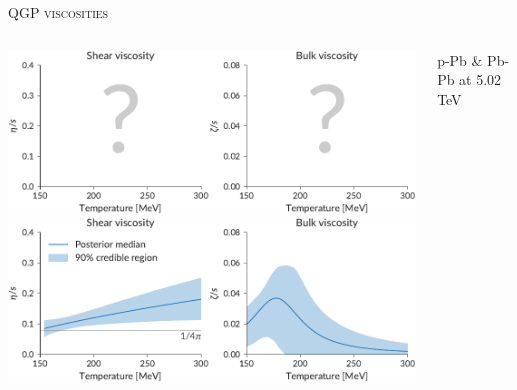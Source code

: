 \documentclass[aspectratio=169]{beamer}
\begin{document}
\begin{frame}{\scshape QGP viscosities}
  \bigskip
  \begin{columns}
    \begin{column}{.6\textwidth}
      \includegraphics[width=\textwidth]{fig/region_shear_bulk_blank}\\[2ex]
      \includegraphics[width=\textwidth]{fig/region_shear_bulk}
    \end{column}
    \begin{column}{.4\textwidth}
      p-Pb \& Pb-Pb at 5.02 TeV
    \end{column}
  \end{columns}
\end{frame}

\usebackgroundtemplate{}
\end{document}
